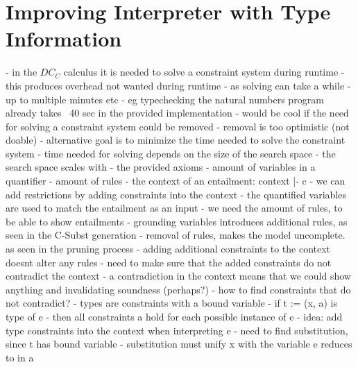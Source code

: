 \chapter{Improving Interpreter with Type Information}
- in the $DC_C$ calculus it is needed to solve a constraint system during runtime
- this produces overhead not wanted during runtime 
  - as solving can take a while
    - up to multiple minutes etc
    - eg typechecking the natural numbers program already takes ~40 sec in the provided implementation
- would be cool if the need for solving a constraint system could be removed
- removal is too optimistic (not doable)
- alternative goal is to minimize the time needed to solve the constraint system
- time needed for solving depends on the size of the search space
- the search space scales with
  - the provided axioms
    - amount of variables in a quantifier
    - amount of rules
  - the context of an entailment: context |- c
    - we can add restrictions by adding constraints into the context
- the quantified variables are used to match the entailment as an input
- we need the amount of rules, to be able to show entailments
- grounding variables introduces additional rules, as seen in the C-Subst generation
- removal of rules, makes the model uncomplete. as seen in the pruning process
- adding additional constraints to the context doesnt alter any rules
- need to make sure that the added constraints do not contradict the context
  - a contradiction in the context means that we could show anything and invalidating soundness (perhaps?)
- how to find constraints that do not contradict?
- types are constraints with a bound variable
- if t := (x, a) is type of e
  - then all constraints a hold for each possible instance of e
- idea: add type constraints into the context when interpreting e
- need to find substitution, since t has bound variable
  - substitution must unify x with the variable e reduces to in a

